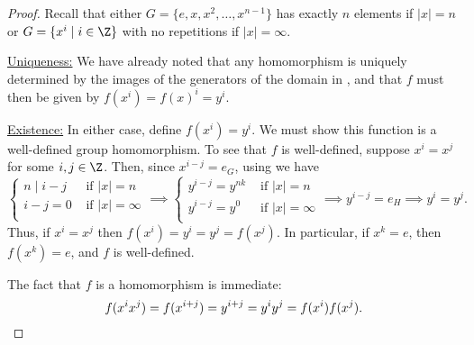 \begin{proof} 
Recall that either $G = \{e,x,x^2, \dots, x^{n-1}\}$ has exactly $n$ elements if $|x| = n$ or $G = \{ x^i \mid i \in \Z \}$ with no repetitions if $|x| = \infty$. 
  
  \vspace{0.4em}
  
  \underline{Uniqueness:} We have already noted that any homomorphism is uniquely determined by the images of the generators of the domain in , and that $f$ must then be given by $f(x^i) =f(x)^i = y^i$. 
%  
  
   \vspace{0.4em}
   
   \underline{Existence:} 
In either case, define $f(x^i) = y^i$.  We must show this function is a well-defined group homomorphism.
To see that $f$ is well-defined, suppose $x^i=x^j$ for some $i,j\in \Z$. Then, since $x^{i-j}=e_G$, using  we have
$$\begin{cases}
n\mid i-j & \text{ if } |x|=n\\
i-j=0 & \text{ if } |x|=\infty\\
\end{cases}
\implies
\begin{cases}
y^ {i-j}=y^{nk} & \text{ if } |x|=n\\
y^{i-j}=y^0 & \text{ if } |x|=\infty\\
\end{cases}
\implies y^ {i-j}=e_H
\implies y^ i=y^j.
$$
Thus, if $x^i=x^j$ then $f(x^i)=y^i=y^j=f(x^j)$. In particular, if $x^k = e$, then $f(x^k) = e$, and $f$ is well-defined.

\vspace{0.4em}

The fact that $f$ is a homomorphism is immediate: 
$$f(x^ix^j)=f(x^{i+j})=y^{i+j}=y^iy^j=f(x^i)f(x^j).\qedhere$$
\end{proof}



